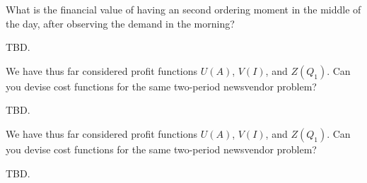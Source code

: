 \begin{question}
What is the financial value of having an second ordering moment in the middle of the day, after observing the demand in the morning?
   \begin{solution}
     TBD.
   \end{solution}
\end{question}

\begin{question}
We have thus far considered profit functions $U(A)$, $V(I)$, and $Z(Q_1)$. Can you devise cost functions for the same two-period newsvendor problem?
   \begin{solution}
     TBD.
   \end{solution}
\end{question}

\begin{question}
We have thus far considered profit functions $U(A)$, $V(I)$, and $Z(Q_1)$. Can you devise cost functions for the same two-period newsvendor problem?
   \begin{solution}
     TBD.
   \end{solution}
\end{question}

